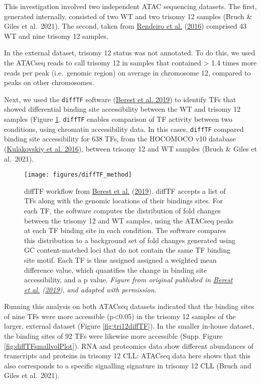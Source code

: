 \documentclass[11pt, a4paper, twosided]{book}
\begin{document}
This investigation involved two independent ATAC sequencing datasets. The first, generated internally, consisted of two WT and two trisomy 12 samples (Bruch \& Giles et al.~2021). The second, taken from \protect\hyperlink{ref-Rendeiro2016}{Rendeiro et al.} (\protect\hyperlink{ref-Rendeiro2016}{2016}) comprised 43 WT and nine trisomy 12 samples.

In the external dataset, trisomy 12 status was not annotated. To do this, we used the ATACseq reads to call trisomy 12 in samples that contained \textgreater{} 1.4 times more reads per peak (i.e.~genomic region) on average in chromosome 12, compared to peaks on other chromosomes.

Next, we used the \texttt{diffTF} software (\protect\hyperlink{ref-Berest2019}{Berest et al. 2019}) to identify TFs that showed differential binding site accessibility between the WT and trisomy 12 samples (Figure \ref{fig:diffTFexplainer}. \texttt{diffTF} enables comparison of TF activity between two conditions, using chromatin accessibility data. In this cases, \texttt{diffTF} compared binding site accessibility for 638 TFs, from the HOCOMOCO v10 database (\protect\hyperlink{ref-HOCOMOCO}{Kulakovskiy et al. 2016}), between trisomy 12 and WT samples (Bruch \& Giles et al.~2021).


\begin{figure}

{\centering \texttt{[image: figures/diffTF\_method]} 

}

\caption{diffTF workflow from \protect\hyperlink{ref-Berest2019}{Berest et al.} (\protect\hyperlink{ref-Berest2019}{2019}). diffTF accepts a list of TFs along with the genomic locations of their bindings sites. For each TF, the software computes the distribution of fold changes between the trisomy 12 and WT samples, using the ATACseq peaks at each TF binding site in each condition. The software compares this distribution to a background set of fold changes generated using GC content-matched loci that do not contain the same TF binding site motif. Each TF is thus assigned assigned a weighted mean difference value, which quantifies the change in binding site accessibility, and a p value. \emph{Figure from original published in \protect\hyperlink{ref-Berest2019}{Berest et al.} (\protect\hyperlink{ref-Berest2019}{2019}), and adapted with permission.}}\label{fig:diffTFexplainer}
\end{figure}
Running this analysis on both ATACseq datasets indicated that the binding sites of nine TFs were more accessible (p\textless0.05) in the trisomy 12 samples of the larger, external dataset (Figure \ref{fig:tri12diffTF}). In the smaller in-house dataset, the binding sites of 92 TFs were likewise more accessible (Supp. Figure \ref{fig:diffTFsmallvolPlot}). RNA and proteomics data show different abundances of transcripts and proteins in trisomy 12 CLL: ATACseq data here shows that this also corresponds to a specific signalling signature in trisomy 12 CLL (Bruch and Giles et al.~2021).
\end{document}
